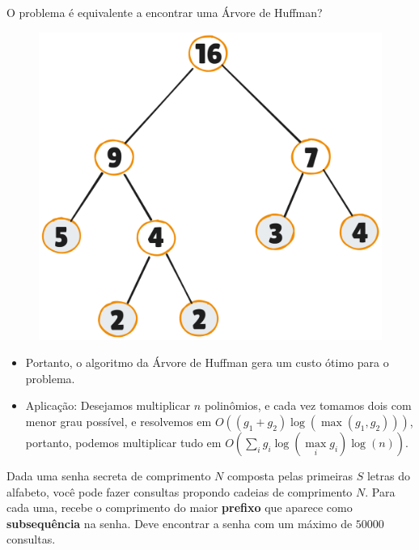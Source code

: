 \documentclass[12pt]{beamer}
\begin{document}
\begin{frame}
\begin{bloco}
O problema é equivalente a encontrar uma Árvore de Huffman?

\begin{figure}
    \centering
    \includegraphics[width=0.4\linewidth]{img/ht3.png}
    \label{fig:enter-label}
\end{figure}

\end{bloco}
\end{frame}

\begin{frame}
\begin{bloco}

\begin{itemize}
    \item Portanto, o algoritmo da Árvore de Huffman gera um custo ótimo para o problema. 
    \pause
    \item Aplicação: Desejamos multiplicar $n$ polinômios, e cada vez tomamos dois com menor grau possível, e resolvemos em $O((g_1 + g_2)\log(\max(g_1, g_2)))$, portanto, podemos multiplicar tudo em $O(\sum\limits_i g_i \log(\max\limits_i g_i)\log(n))$.
\end{itemize}

\end{bloco}
\end{frame}

\begin{frame}
\begin{bloco}

Dada uma senha secreta de comprimento $N$ composta pelas primeiras $S$ letras do alfabeto, você pode fazer consultas propondo cadeias de comprimento $N$. Para cada uma, recebe o comprimento do maior \textbf{prefixo} que aparece como \textbf{subsequência} na senha. Deve encontrar a senha com um máximo de $50000$ consultas.

\end{bloco}
\end{frame}
\end{document}
